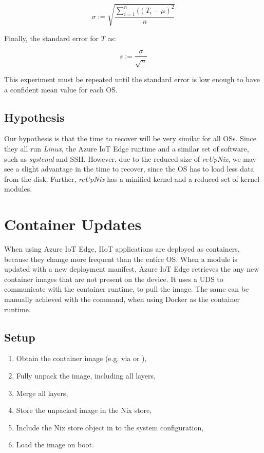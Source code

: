 \begin{equation}
   \sigma := \sqrt{\frac{\sum_{i=1}^{n}((T_i - \mu)^2}{n}}
\end{equation}

\noindent
Finally, the standard error for $T$ as:

\begin{equation}
    s := \frac{\sigma}{\sqrt{n}}
\end{equation}

\noindent
This experiment must be repeated until the standard error is low enough
to have a confident mean value for each \ac{OS}.

\subsection{Hypothesis}
Our hypothesis is that the time to recover will be very similar for all
\ac{OS}s. Since they all run \textit{Linux}, the Azure IoT Edge runtime and
a similar set of software, such as \textit{systemd} and \ac{SSH}. However, due
to the reduced size of \textit{reUpNix}, we may see a slight advantage in the
time to recover, since the \ac{OS} has to load less data from the disk. Further,
\textit{reUpNix} has a minified kernel and a reduced set of kernel modules.

\section{Container Updates}
When using Azure IoT Edge, \ac{IIoT} applications are deployed as containers, because
they change more frequent than the entire \ac{OS}. When a module is updated
with a new deployment manifest, Azure IoT Edge retrieves the any new container
images that are not present on the device. It uses a \ac{UDS} to communicate
with the container runtime, to pull the image. The same can be manually achieved
with the  command, when using Docker as the container runtime.

\subsection{Setup}
\begin{enumerate}
    \item Obtain the container image (e.g. via  or ),
    \item Fully unpack the image, including all layers,
    \item Merge all layers,
    \item Store the unpacked image in the Nix store,
    \item Include the Nix store object in to the system configuration,
    \item Load the image on boot.
\end{enumerate}
